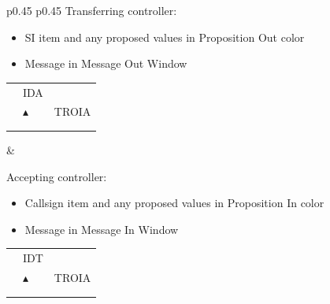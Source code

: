 \documentclass[a4paper,oneside,11pt]{memoir}
\newcommand{\colorref}[1]{\colorbox{Flight Highlight}{\color{#1}#1}}
\begin{document}
\begin{longtable}{p{} p{}}
  Transferring controller:

\begin{itemize}
  \item SI item and any proposed values in \colorref{Proposition Out} color
  \item Message in Message Out Window
\end{itemize}

\begin{tabular}{
  >{\columncolor{Flight Highlight}}l 
  >{\columncolor{Flight Highlight}}l
  >{\columncolor{Flight Highlight}}l }
  {\color{Assumed} ABC123} & {\color{Proposition In} IDA}       & {\color{Assumed} }\\
  {\color{Assumed} 100}    & {\color{Assumed} $\blacktriangle$} & {\color{Assumed} TROIA}\\
  {\color{Assumed} 180}    & {\color{Assumed} }          & {\color{Assumed} }\\  
  {\color{Proposition In} H360}    & {\color{Assumed} }          & {\color{Assumed} }\\  
\end{tabular}
  &
  
  Accepting controller:

\begin{itemize}
  \item Callsign item and any proposed values in \colorref{Proposition In} color
  \item Message in Message In Window
\end{itemize}

\begin{tabular}{
  >{\columncolor{Flight Highlight}}l 
  >{\columncolor{Flight Highlight}}l
  >{\columncolor{Flight Highlight}}l }
  {\color{Proposition In} ABC123} & {\color{Coordination} IDT}       & {\color{Coordination} }\\
  {\color{Coordination} 100}    & {\color{Coordination} $\blacktriangle$} & {\color{Coordination} TROIA}\\
  {\color{Coordination} 180}    & {\color{Coordination} }          & {\color{Coordination} }\\
  {\color{Proposition In} H360}    & {\color{Coordination} }          & {\color{Coordination} }\\      
\end{tabular}
\end{longtable}

\bigskip
\end{document}

